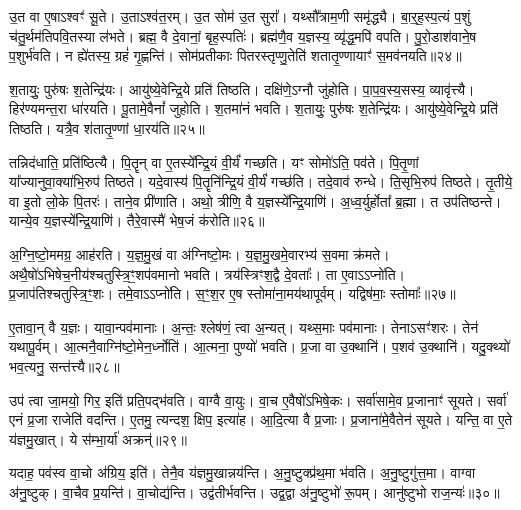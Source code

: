 उ॒त वा ए॒षा\-ऽश्वꣳ॑ सू॒ते।
उ॒ताऽश्व॑त॒रम्।
उ॒त सोम॑ उ॒त सुरा᳚।
यथ्सौ᳚त्राम॒णी समृ॑द्ध्यै।
बा॒र्॒ह॒स्प॒त्यं प॒शुं च॑तु॒र्थम॑तिपवि॒तस्या ल॑भते।
ब्रह्म॒ वै दे॒वानां॒ बृह॒स्पतिः॑।
ब्रह्म॑णै॒व य॒ज्ञस्य॒ व्यृ॑द्ध॒मपि॑ वपति।
पु॒रो॒डाश॑वाने॒ष प॒शुर्भ॑वति।
न ह्ये॑तस्य॒ ग्रहं॑ गृ॒ह्णन्ति॑।
सोम॑प्रतीकाः पितरस्तृप्णु॒तेति॑ शतातृ॒ण्णायाꣳ॑ स॒मव॑नयति॥२४॥

श॒तायुः॒ पुरु॑षः श॒तेन्द्रि॑यः।
आयु॑ष्ये॒वेन्द्रि॒ये प्रति॑ तिष्ठति।
दक्षि॑णे॒\-ऽग्नौ जु॑होति।
पा॒प॒व॒स्य॒सस्य॒ व्यावृ॑त्त्यै।
हिर॑ण्यमन्त॒रा धा॑रयति।
पू॒तामे॒वैनां᳚ जुहोति।
श॒तमा॑नं भवति।
श॒तायुः॒ पुरु॑षः श॒तेन्द्रि॑यः।
आयु॑ष्ये॒वेन्द्रि॒ये प्रति॑ तिष्ठति।
यत्रै॒व श॑तातृ॒ण्णां धा॒रय॑ति॥२५॥

तन्निद॑धाति॒ प्रति॑\-ष्ठित्यै।
पि॒तॄन् वा ए॒तस्ये᳚न्द्रि॒यं वी॒र्यं॑ गच्छति।
यꣳ सोमो॑ऽति॒ पव॑ते।
पि॒तृ॒णां या᳚ज्यानुवा॒क्या॑भि॒रुप॑ तिष्ठते।
यदे॒वास्य॑ पि॒तॄनि॑न्द्रि॒यं वी॒र्यं॑ गच्छ॑ति।
तदे॒वाव॑ रुन्धे।
ति॒सृभि॒रुप॑ तिष्ठते।
तृ॒तीये॒ वा इ॒तो लो॒के पि॒तरः॑।
ताने॒व प्री॑णाति।
अथो॒ त्रीणि॒ वै य॒ज्ञस्ये᳚न्द्रि॒याणि॑।
अ॒ध्व॒र्युर्\mbox{}होता᳚ ब्र॒ह्मा।
त उप॑तिष्ठन्ते।
यान्ये॒व य॒ज्ञस्ये᳚न्द्रि॒याणि॑।
तैरे॒वास्मै॑ भेष॒जं क॑रोति॥२६॥\anuvakamend[प्री॒णा॒ति॒ प्र॒थ॒मो दक्षि॑णा स॒मव॑नयति धा॒रय॑तीन्द्रि॒याणि॑ च॒त्वारि॑ च]

अ॒ग्नि॒ष्टो॒ममग्र॒ आह॑रति।
य॒ज्ञ॒\-मु॒खं वा अ॑ग्निष्टो॒मः।
य॒ज्ञ॒\-मु॒खमे॒वारभ्य॑ स॒वमा क्र॑मते।
अथै॒षो॑\-ऽभिषेच॒नीय॑श्चतु\-स्त्रि॒ꣳ॒शप॑वमानो भवति।
त्रय॑स्त्रिꣳश॒द्वै दे॒वताः᳚।
ता ए॒वाऽऽप्नो॑ति।
प्र॒जा\-प॑तिश्चतुस्त्रि॒ꣳ॒शः।
तमे॒वाऽऽप्नो॑ति।
स॒ꣳ॒श॒र ए॒ष स्तोमा॑ना॒मय॑था\-पूर्वम्।
यद्विष॑माः॒ स्तोमाः᳚॥२७॥

ए॒तावा॒न् वै य॒ज्ञः।
यावा॒न्पव॑मानाः।
अ॒न्तः॒ श्लेष॑णं॒ त्वा अ॒न्यत्।
यथ्स॒माः पव॑मानाः।
तेनाऽसꣳ॑शरः।
तेन॑ यथापू॒र्वम्।
आ॒त्मनै॒वाग्नि॑ष्टो॒मेन॒र्ध्नोति॑।
आ॒त्मना॒ पुण्यो॑ भवति।
प्र॒जा वा उ॒क्थानि॑।
प॒शव॑ उ॒क्थानि॑।
यदु॒क्थ्यो॑ भव॒त्यनु॒ सन्त॑त्त्यै॥२८॥\anuvakamend[स्तोमाः᳚ प॒शव॑ उ॒क्थान्येकं॑ च]

उप॑ त्वा जा॒मयो॒ गिर॒ इति॑ प्रति॒पद्भ॑वति।
वाग्वै वा॒युः।
वा॒च ए॒वैषो॑\-ऽभिषे॒कः।
सर्वा॑सामे॒व प्र॒जानाꣳ॑ सूयते।
सर्वा॑ एनं प्र॒जा राजेति॑ वदन्ति।
ए॒तमु॒ त्यन्दश॒ क्षिप॒ इत्या॑ह।
आ॒दि॒त्या वै प्र॒जाः।
प्र॒जाना॑मे॒वैतेन॑ सूयते।
यन्ति॒ वा ए॒ते य॑ज्ञमु॒खात्।
ये स॑म्भा॒र्या॑ अक्रन्॑॥२९॥

यदाह॒ पव॑स्व वा॒चो अ॑ग्रिय॒ इति॑।
तेनै॒व य॑ज्ञमु॒खान्नय॑न्ति।
अ॒नु॒ष्टुक्प्र॑थ॒मा भ॑वति।
अ॒नु॒ष्टुगु॑त्त॒मा।
वाग्वा अ॑नु॒ष्टुक्।
वा॒चैव प्र॒यन्ति॑।
वा॒चोद्य॑न्ति।
उद्व॑तीर्भवन्ति।
उद्व॒द्वा अ॑नु॒ष्टुभो॑ रू॒पम्।
आनु॑ष्टुभो राज॒न्यः॑॥३०॥

